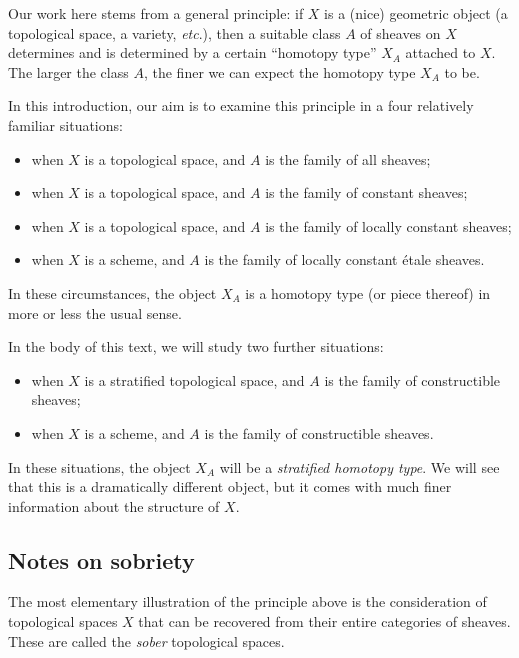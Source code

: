 
Our work here stems from a general principle: if $ X $ is a (nice) geometric object (a topological space, a variety, \emph{etc}.), then a suitable class $ A $ of sheaves on $ X $ determines and is determined by a certain \enquote{homotopy type} $ X_A $ attached to $ X $.
The larger the class $ A $, the finer we can expect the homotopy type $ X_A $ to be.

In this introduction, our aim is to examine this principle in a four relatively familiar situations:
\begin{itemize}
	\item when $ X $ is a topological space, and $ A $ is the family of all sheaves;
	\item when $ X $ is a topological space, and $ A $ is the family of constant sheaves;
	\item when $ X $ is a topological space, and $ A $ is the family of locally constant sheaves;
	\item when $ X $ is a scheme, and $ A $ is the family of locally constant étale sheaves. 
\end{itemize}
In these circumstances, the object $ X_A $ is a homotopy type (or piece thereof) in more or less the usual sense.

In the body of this text, we will study two further situations:
\begin{itemize}
	\item when $ X $ is a stratified topological space, and $ A $ is the family of constructible sheaves;
	\item when $ X $ is a scheme, and $ A $ is the family of constructible sheaves.
\end{itemize}
In these situations, the object $ X_A $ will be a \emph{stratified homotopy type}.
We will see that this is a dramatically different object, but it comes with much finer information about the structure of $ X $.

\subsection{Notes on sobriety}%
\label{sub:notes_on_sobriety}

The most elementary illustration of the principle above is the consideration of topological spaces $ X $ that can be recovered from their entire categories of sheaves.
These are called the \emph{sober} topological spaces.

